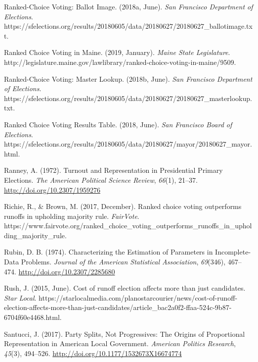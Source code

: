 \documentclass[12pt,twoside]{reedthesis}
\begin{document}
\leavevmode\hypertarget{ref-noauthor_ranked-choice_2018-1}{}%
Ranked-Choice Voting: Ballot Image. (2018a, June). \emph{San Francisco Department of Elections}. https://sfelections.org/results/20180605/data/20180627/20180627\_ballotimage.txt.

\leavevmode\hypertarget{ref-noauthor_ranked_2019}{}%
Ranked Choice Voting in Maine. (2019, January). \emph{Maine State Legislature}. http://legislature.maine.gov/lawlibrary/ranked-choice-voting-in-maine/9509.

\leavevmode\hypertarget{ref-noauthor_ranked-choice_2018}{}%
Ranked-Choice Voting: Master Lookup. (2018b, June). \emph{San Francisco Department of Elections}. https://sfelections.org/results/20180605/data/20180627/20180627\_masterlookup.txt.

\leavevmode\hypertarget{ref-noauthor_ranked_2018}{}%
Ranked Choice Voting Results Table. (2018, June). \emph{San Francisco Board of Elections}. https://sfelections.org/results/20180605/data/20180627/mayor/20180627\_mayor.html.

\leavevmode\hypertarget{ref-ranney_turnout_1972}{}%
Ranney, A. (1972). Turnout and Representation in Presidential Primary Elections. \emph{The American Political Science Review}, \emph{66}(1), 21--37. \url{http://doi.org/10.2307/1959276}

\leavevmode\hypertarget{ref-richie_ranked_2017}{}%
Richie, R., \& Brown, M. (2017, December). Ranked choice voting outperforms runoffs in upholding majority rule. \emph{FairVote}. https://www.fairvote.org/ranked\_choice\_voting\_outperforms\_runoffs\_in\_upholding\_majority\_rule.

\leavevmode\hypertarget{ref-rubin_characterizing_1974}{}%
Rubin, D. B. (1974). Characterizing the Estimation of Parameters in Incomplete-Data Problems. \emph{Journal of the American Statistical Association}, \emph{69}(346), 467--474. \url{http://doi.org/10.2307/2285680}

\leavevmode\hypertarget{ref-rush_cost_2015}{}%
Rush, J. (2015, June). Cost of runoff election affects more than just candidates. \emph{Star Local}. https://starlocalmedia.com/planostarcourier/news/cost-of-runoff-election-affects-more-than-just-candidates/article\_bac2a0f2-ffaa-524c-9b87-6704f60e4468.html.

\leavevmode\hypertarget{ref-santucci_party_2017}{}%
Santucci, J. (2017). Party Splits, Not Progressives: The Origins of Proportional Representation in American Local Government. \emph{American Politics Research}, \emph{45}(3), 494--526. \url{http://doi.org/10.1177/1532673X16674774}
\end{document}
